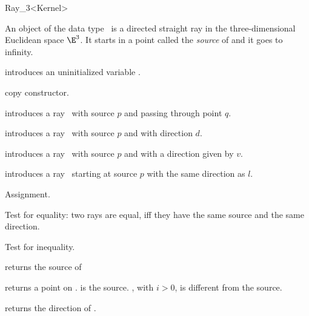 \begin{ccRefClass} {Ray_3<Kernel>}

\ccDefinition
An object  of the data type \ccRefName\ is a directed
straight ray in the three-dimensional Euclidean space $\E^3$. It starts
in a  point called the {\em source} of   and it goes to infinity.


\ccCreation
{}


\ccHidden {}
             {introduces an uninitialized variable \ccVar.}

\ccHidden {}
 	    {copy constructor.}

            {introduces a ray \ccVar\ 
             with source $p$ and passing through point $q$.}

            {introduces a ray \ccVar\ with source $p$ and with 
             direction $d$.}

            {introduces a ray \ccVar\ with source $p$ and with 
             a direction given by $v$.}

            {introduces a ray \ccVar\ starting at source $p$ with 
             the same direction as $l$.}

\ccOperations

\ccHidden {}
        {Assignment.}

       {Test for equality: two rays are equal, iff they have the same 
        source and the same direction.}

       {Test for inequality.}



       {returns the source of \ccVar}

       {returns a point on \ccVar.  is the source.
        \ccStyle{point(i)}, with $i>0$, is different from the 
        source. }

       {returns the direction of \ccVar.}


\end{ccRefClass}
